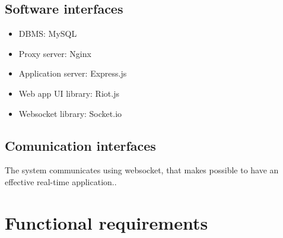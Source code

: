 \subsection{Software interfaces}
\begin{itemize}
\item DBMS: MySQL
\item Proxy server: Nginx
\item Application server: Express.js
\item Web app UI library: Riot.js
\item Websocket library: Socket.io
\end{itemize}
\subsection{Comunication interfaces}
The system communicates using websocket, that makes possible to have an effective real-time application..

\section{Functional requirements}


